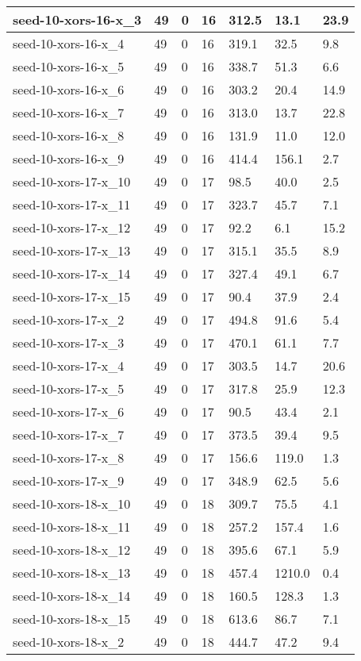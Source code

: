 \begin{scriptsize}
\begin{longtable}{|p{5cm}|l|l|l|l|l|l|}
seed-10-xors-16-x\_3&49&0&16&312.5&13.1&23.9 \\ \hline 
seed-10-xors-16-x\_4&49&0&16&319.1&32.5&9.8 \\ \hline 
seed-10-xors-16-x\_5&49&0&16&338.7&51.3&6.6 \\ \hline 
seed-10-xors-16-x\_6&49&0&16&303.2&20.4&14.9 \\ \hline 
seed-10-xors-16-x\_7&49&0&16&313.0&13.7&22.8 \\ \hline 
seed-10-xors-16-x\_8&49&0&16&131.9&11.0&12.0 \\ \hline 
seed-10-xors-16-x\_9&49&0&16&414.4&156.1&2.7 \\ \hline 
seed-10-xors-17-x\_10&49&0&17&98.5&40.0&2.5 \\ \hline 
seed-10-xors-17-x\_11&49&0&17&323.7&45.7&7.1 \\ \hline 
seed-10-xors-17-x\_12&49&0&17&92.2&6.1&15.2 \\ \hline 
seed-10-xors-17-x\_13&49&0&17&315.1&35.5&8.9 \\ \hline 
seed-10-xors-17-x\_14&49&0&17&327.4&49.1&6.7 \\ \hline 
seed-10-xors-17-x\_15&49&0&17&90.4&37.9&2.4 \\ \hline 
seed-10-xors-17-x\_2&49&0&17&494.8&91.6&5.4 \\ \hline 
seed-10-xors-17-x\_3&49&0&17&470.1&61.1&7.7 \\ \hline 
seed-10-xors-17-x\_4&49&0&17&303.5&14.7&20.6 \\ \hline 
seed-10-xors-17-x\_5&49&0&17&317.8&25.9&12.3 \\ \hline 
seed-10-xors-17-x\_6&49&0&17&90.5&43.4&2.1 \\ \hline 
seed-10-xors-17-x\_7&49&0&17&373.5&39.4&9.5 \\ \hline 
seed-10-xors-17-x\_8&49&0&17&156.6&119.0&1.3 \\ \hline 
seed-10-xors-17-x\_9&49&0&17&348.9&62.5&5.6 \\ \hline 
seed-10-xors-18-x\_10&49&0&18&309.7&75.5&4.1 \\ \hline 
seed-10-xors-18-x\_11&49&0&18&257.2&157.4&1.6 \\ \hline 
seed-10-xors-18-x\_12&49&0&18&395.6&67.1&5.9 \\ \hline 
seed-10-xors-18-x\_13&49&0&18&457.4&1210.0&0.4 \\ \hline 
seed-10-xors-18-x\_14&49&0&18&160.5&128.3&1.3 \\ \hline 
seed-10-xors-18-x\_15&49&0&18&613.6&86.7&7.1 \\ \hline 
seed-10-xors-18-x\_2&49&0&18&444.7&47.2&9.4 \\ \hline 

\end{longtable}
\end{scriptsize}
